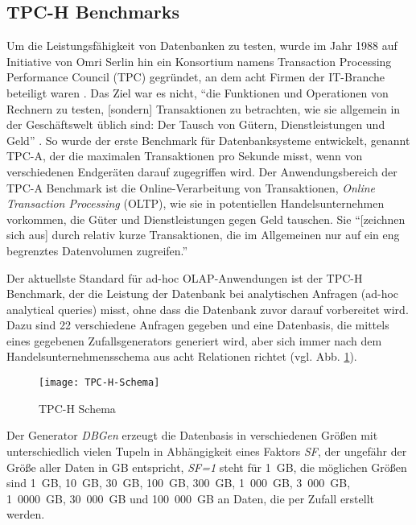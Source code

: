 \subsection{TPC-H Benchmarks}
Um die Leistungsfähigkeit von Datenbanken zu testen, wurde im Jahr 1988 auf Initiative von Omri Serlin hin ein Konsortium namens Transaction Processing Performance Council (TPC) gegründet, an dem acht Firmen der IT-Branche beteiligt waren \cite{HistoryTPC}.
Das Ziel war es nicht, "`die Funktionen und Operationen von Rechnern zu testen, [sondern] Transaktionen zu betrachten, wie sie allgemein in der Geschäftswelt üblich sind: Der Tausch von Gütern, Dienstleistungen und Geld"' \cite{AboutTPC}.
So wurde der erste Benchmark für Datenbanksysteme entwickelt, genannt TPC-A, der die maximalen Transaktionen pro Sekunde misst, wenn von verschiedenen Endgeräten darauf zugegriffen wird. Der Anwendungsbereich der TPC-A Benchmark ist die Online-Verarbeitung von Transaktionen, \textit{Online Transaction Processing} (OLTP), wie sie in potentiellen Handelsunternehmen vorkommen, die Güter und Dienstleistungen gegen Geld tauschen. Sie "`[zeichnen sich aus] durch relativ kurze Transaktionen, die im Allgemeinen nur auf ein eng begrenztes Datenvolumen zugreifen."'\cite[S. 711]{Kemper}

Der aktuellste Standard für ad-hoc OLAP-Anwendungen ist der TPC-H Benchmark, der die Leistung der Datenbank bei analytischen Anfragen (ad-hoc analytical queries) misst, ohne dass die Datenbank zuvor darauf vorbereitet wird. Dazu sind 22 verschiedene Anfragen gegeben und eine Datenbasis, die mittels eines gegebenen Zufallsgenerators generiert wird, aber sich immer nach dem Handelsunternehmensschema aus acht Relationen richtet (vgl. Abb. \ref{fig:TPC-H-Schema}).

\begin{figure}
\centering
\texttt{[image: TPC-H-Schema]}
\caption{TPC-H Schema \cite{TPC-H}}
\label{fig:TPC-H-Schema}
\end{figure}

Der Generator \textit{DBGen} erzeugt die Datenbasis in verschiedenen Größen mit unterschiedlich vielen Tupeln in Abhängigkeit eines Faktors \textit{SF}, der ungefähr der Größe aller Daten in GB entspricht, \textit{SF=1} steht für 1\ GB, die möglichen Größen sind 1\ GB, 10\ GB, 30\ GB, 100\ GB, 300\ GB, 1\ 000\ GB, 3\ 000\ GB, 1\ 0000\ GB, 30\ 000\ GB und 100\ 000\ GB an Daten, die per Zufall erstellt werden.

